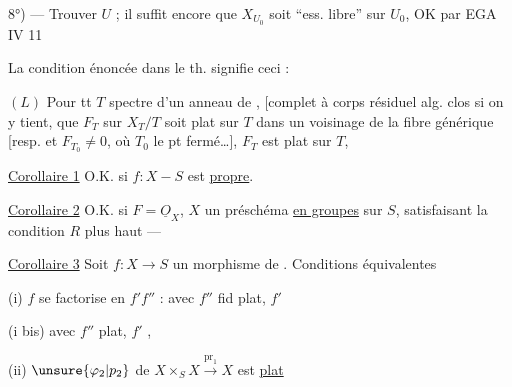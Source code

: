 8°) --- Trouver $U$ ; il suffit encore que $X_{U_0}$ soit ``ess. libre'' sur $U_0$, OK par EGA IV 11

La condition énoncée dans le th. signifie ceci :

$(L)$ Pour tt $T$ spectre d'un anneau de  , [complet à corps résiduel alg. clos si on y tient,   que $F_T$ sur $X_T/T$ soit plat sur $T$ dans un voisinage de la fibre générique [resp. et $F_{T_0}\ne0$, où $T_0$ le pt fermé\ldots],  $F_T$ est plat sur $T$, 

\uline{Corollaire 1} O.K. si $f:X-S$ est \uline{propre}.

\uline{Corollaire 2} O.K. si  $F=\underline{O}_X$, $X$ un préschéma \uline{en groupes} sur $S$, satisfaisant la condition $R$ plus haut ---

\uline{Corollaire 3} Soit $f:X\longrightarrow S$ un morphisme de  . Conditions équivalentes

(i) $f$ se factorise en $f'f''$ :  avec $f''$ fid plat, $f'$ 

(i bis)  avec $f''$ plat, $f'$ ,

(ii) $\unsure{\varphi_2|p_2}$ de $X\times_S X\xrightarrow{\mathrm{pr}_1}X$ est \uline{plat}
